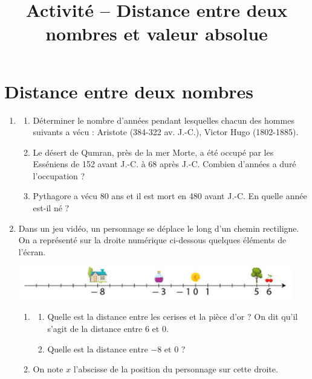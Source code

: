 \documentclass[a4paper,dvipsnames]{article}
\begin{document}
\title{Activité -- Distance entre deux nombres et valeur absolue}

\date{}
\author{}

\maketitle{}

\thispagestyle{empty}
\pagestyle{empty}

\section{Distance entre deux nombres}

\begin{enumerate}
  \item 
    \begin{enumerate}
      \item Déterminer le nombre d'années pendant lesquelles chacun des hommes suivants a vécu : Aristote (384-322 av. J.-C.), Victor Hugo (1802-1885).
      \item Le désert de Qumran, près de la mer Morte, a été occupé par les Esséniens de 152 avant J.-C. à 68 après J.-C. Combien d'années a duré l'occupation ?
      \item Pythagore a vécu 80 ans et il est mort en 480 avant J.-C. En quelle année est-il né ?
    \end{enumerate}
  \item Dans un jeu vidéo, un personnage se déplace le long d'un chemin rectiligne. On a représenté sur la droite numérique ci-dessous quelques éléments de l'écran.
    \begin{center}
      \includegraphics[width=12cm]{1_4_activite_introduction_jeu_video.png}
    \end{center}
    \begin{enumerate}
      \item 
	\begin{enumerate}
	  \item Quelle est la distance entre les cerises et la pièce d'or ? On dit qu'il s'agit de la distance entre $6$ et $0$.
	  \item Quelle est la distance entre $-8$ et $0$ ?
	\end{enumerate}
      \item On note $x$ l'abscisse de la position du personnage sur cette droite.

\end{enumerate}
\end{enumerate}
\end{document}
